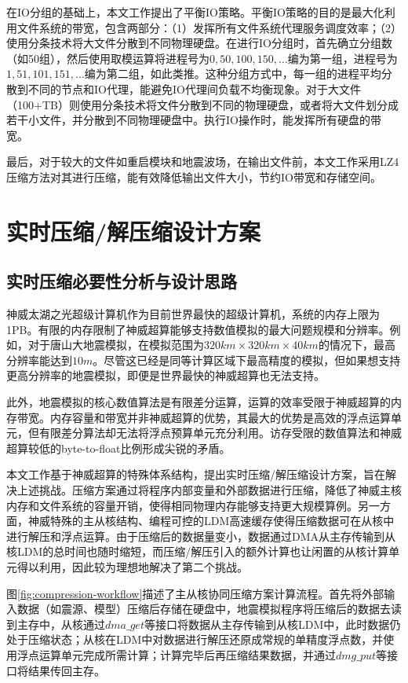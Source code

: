 \documentclass[degree=doctor]{thuthesis}
\begin{document}
在IO分组的基础上，本文工作提出了平衡IO策略。平衡IO策略的目的是最大化利用文件系统的带宽，包含两部分：（1）发挥所有文件系统代理服务调度效率；（2）使用分条技术将大文件分散到不同物理硬盘。在进行IO分组时，首先确立分组数（如50组），然后使用取模运算将进程号为$0,50,100,150,\ldots$编为第一组，进程号为$1,51,101,151,\ldots$编为第二组，如此类推。这种分组方式中，每一组的进程平均分散到不同的节点和IO代理，能避免IO代理间负载不均衡现象。对于大文件（100+TB）则使用分条技术将文件分散到不同的物理硬盘，或者将大文件划分成若干小文件，并分散到不同物理硬盘中。执行IO操作时，能发挥所有硬盘的带宽。

最后，对于较大的文件如重启模块和地震波场，在输出文件前，本文工作采用LZ4压缩方法对其进行压缩，能有效降低输出文件大小，节约IO带宽和存储空间。

\section{实时压缩/解压缩设计方案}
\label{sec:实时压缩/解压缩设计方案}
\subsection{实时压缩必要性分析与设计思路}

神威太湖之光超级计算机作为目前世界最快的超级计算机，系统的内存上限为1PB。有限的内存限制了神威超算能够支持数值模拟的最大问题规模和分辨率。例如，对于唐山大地震模拟，在模拟范围为$320km\times 320km \times 40km$的情况下，最高分辨率能达到$10m$。尽管这已经是同等计算区域下最高精度的模拟，但如果想支持更高分辨率的地震模拟，即便是世界最快的神威超算也无法支持。

此外，地震模拟的核心数值算法是有限差分运算，运算的效率受限于神威超算的内存带宽。内存容量和带宽并非神威超算的优势，其最大的优势是高效的浮点运算单元，但有限差分算法却无法将浮点预算单元充分利用。访存受限的数值算法和神威超算较低的byte-to-float比例形成尖锐的矛盾。

本文工作基于神威超算的特殊体系结构，提出实时压缩/解压缩设计方案，旨在解决上述挑战。压缩方案通过将程序内部变量和外部数据进行压缩，降低了神威主核内存和文件系统的容量开销，使得相同物理内存能够支持更大规模算例。另一方面，神威特殊的主从核结构、编程可控的LDM高速缓存使得压缩数据可在从核中进行解压和浮点运算。由于压缩后的数据量变小，数据通过DMA从主存传输到从核LDM的总时间也随时缩短，而压缩/解压引入的额外计算也让闲置的从核计算单元得以利用，因此较为理想地解决了第二个挑战。

图\ref{fig:compression-workflow}描述了主从核协同压缩方案计算流程。首先将外部输入数据（如震源、模型）压缩后存储在硬盘中，地震模拟程序将压缩后的数据去读到主存中，从核通过$dma\_get$等接口将数据从主存传输到从核LDM中，此时数据仍处于压缩状态；从核在LDM中对数据进行解压还原成常规的单精度浮点数，并使用浮点运算单元完成所需计算；计算完毕后再压缩结果数据，并通过$dmg\_put$等接口将结果传回主存。
\end{document}
